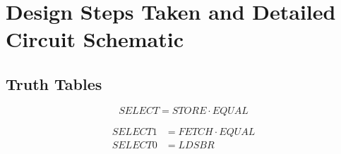 \documentclass[12pt]{article}
\begin{document}
\section{Design Steps Taken and Detailed Circuit Schematic}
\subsection{\textbf{Truth Tables}}
\begin{table}[H]
    \centering
    \caption{Truth table of the 1-bit select signal for memory unit}
\end{table}
$$SELECT=STORE\cdot EQU\!AL$$

\begin{table}[H]
    \centering
    \caption{Truth table of the 2-bit select signal for buffer unit}
\end{table}
$$
\begin{aligned}
    SELECT1&=FETCH\cdot EQU\!AL \\
    SELECT0&=LDSBR
\end{aligned}
$$
\end{document}
